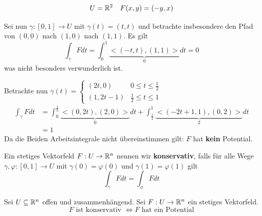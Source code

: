\documentclass[main.tex]{subfiles}
\begin{document}
\begin{Beispiel}
  $$U = \mathbb{R}^2 \quad F(x,y) = (-y,x)$$
  \begin{center}
  \end{center}


  Sei nun $\gamma: [0,1] \to U$ mit $\gamma(t) = (t,t)$ und betrachte insbesondere den Pfad von $(0,0)$ nach $(1,0)$ nach $(1,1)$. Es gilt
  $$\int_\gamma F dt = \int_0^1 \underbrace{<(-t,t),(1,1)>}_{0} dt = 0$$
  was nicht besonders verwunderlich ist.

  Betrachte nun $\gamma(t) = \left\{\begin{aligned}
    (2t,0) & 0 \leq t \leq \frac{1}{2} \\
    (1, 2t-1) & \frac{1}{2} \leq t \leq 1
  \end{aligned}\right.$
  $$\begin{aligned}
    \int_\gamma F dt & = \int_0^{\frac{1}{2}} \underbrace{<(0,2t),(2,0)>}_{0} dt + \int_{\frac{1}{2}}^1 \underbrace{<(-2t+1,1),(0,2)>}_{2} dt \\
    &= 1
  \end{aligned}$$
  Da die Beiden Arbeitsintegrale nicht übereinstimmen gilt: $F$ hat \textbf{kein} Potential.
\end{Beispiel}

\begin{Definition}
  Ein stetiges Vektorfeld $F:U \to \mathbb{R}^n$ nennen wir \textbf{konservativ}, falls für alle Wege $\gamma,\varphi :[0,1] \to U$ mit $\gamma(0) = \varphi(0)$ und $\gamma(1) = \varphi(1)$ gilt
  $$\int_\gamma F dt = \int_\phi F dt$$
\end{Definition}

\begin{Theorem}
  Sei $U \subseteq \mathbb{R}^n$ offen und zusammenhängend. Sei $F: U \to \mathbb{R}^n$ ein stetiges Vektorfeld.
  $$F \text{ ist konservativ } \Leftrightarrow F \text{ hat ein Potential}$$
\end{Theorem}
\end{document}
